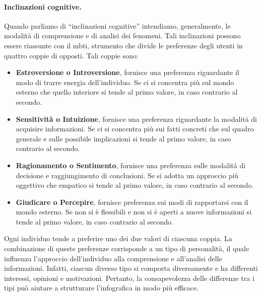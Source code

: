 \paragraph{Inclinazioni cognitive.}
Quando parliamo di ``inclinazioni cognitive'' intendiamo, generalmente, le modalità di comprensione e di analisi dei fenomeni.
Tali inclinazioni possono essere riassunte con il \gls{mbti}, strumento che divide le preferenze degli utenti in quattro coppie di 
opposti. Tali coppie sono:
\begin{itemize}
    \item \textbf{Estroversione o Introversione}, fornisce una preferenza riguardante il modo di trarre energia dell'individuo.
    Se ci si concentra più sul mondo esterno che quello interiore si tende al primo valore, in caso contrario al secondo.   
    \item \textbf{Sensitività o Intuizione}, fornisce una preferenza riguardante la modalità di acquisire informazioni. 
    Se ci si concentra più sui fatti concreti che sul quadro generale e sulle possibile implicazioni si tende al primo valore, in caso contrario al secondo.
    \item \textbf{Ragionamento o Sentimento}, fornisce una preferenza sulle modalità di decisione e raggiungimento di conclusioni.
    Se si adotta un approccio più oggettivo che empatico si tende al primo valore, in caso contrario al secondo.
    \item \textbf{Giudicare o Percepire}, fornisce preferenza sui modi di rapportarsi con il mondo esterno.
    Se non si è flessibili e non si è aperti a nuove informazioni si tende al primo valore, in caso contrario al secondo.
\end{itemize}
Ogni individuo tende a preferire uno dei due valori di ciascuna coppia. La combinazione di queste preferenze corrisponde a un tipo di personalità, il quale influenza l'approccio
dell'individuo alla comprensione e all'analisi delle informazioni. Infatti, ciascun diverso tipo si comporta diversamente e ha differenti interessi, opinioni e motivazioni. 
Pertanto, la consapevolezza delle differenze tra i tipi può aiutare a strutturare l'infografica in modo più efficace.

